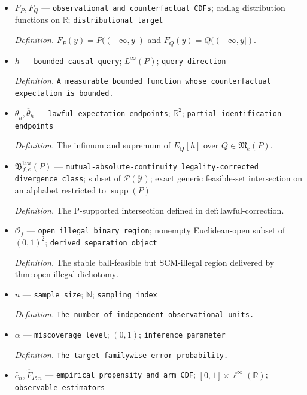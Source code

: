 \documentclass{article}
\begin{document}
\begin{itemize}
  \par\smallskip\noindent\emph{Definition.} The atom-aware piecewise maps defined in \(\mathrm{def:cdf\text{-}maps}\).
  \item \(F_P,F_Q\) --- \texttt{observational and counterfactual CDFs}; cadlag distribution functions on \(\mathbb R\); \texttt{distributional target}
  \par\smallskip\noindent\emph{Definition.} \(F_P(y)=P(({-}\infty,y])\) and \(F_Q(y)=Q(({-}\infty,y])\).
  \item \(h\) --- \texttt{bounded causal query}; \(L^\infty(P)\); \texttt{query direction}
  \par\smallskip\noindent\emph{Definition.} \texttt{A measurable bounded function whose counterfactual expectation is bounded.}
  \item \(\underline\theta_h,\overline\theta_h\) --- \texttt{lawful expectation endpoints}; \(\mathbb R^2\); \texttt{partial-\allowbreak{}identification endpoints}
  \par\smallskip\noindent\emph{Definition.} The infimum and supremum of \(E_Q[h]\) over \(Q\in\mathfrak M_e(P)\).
  \item \(\mathfrak B^{\mathrm{law}}_{f,e}(P)\) --- \texttt{mutual-\allowbreak{}absolute-\allowbreak{}continuity legality-\allowbreak{}corrected divergence class}; subset of \(\mathcal P(\mathcal Y)\); exact generic feasible-set intersection on an alphabet restricted to \(\operatorname{supp}(P)\)
  \par\smallskip\noindent\emph{Definition.} The P-supported intersection defined in \(\mathrm{def:lawful\text{-}correction}\).
  \item \(\mathcal O_f\) --- \texttt{open illegal binary region}; nonempty Euclidean-open subset of \((0,1)^2\); \texttt{derived separation object}
  \par\smallskip\noindent\emph{Definition.} The stable ball-feasible but SCM-illegal region delivered by \(\mathrm{thm:open\text{-}illegal\text{-}dichotomy}\).
  \item \(n\) --- \texttt{sample size}; \(\mathbb N\); \texttt{sampling index}
  \par\smallskip\noindent\emph{Definition.} \texttt{The number of independent observational units.}
  \item \(\alpha\) --- \texttt{miscoverage level}; \((0,1)\); \texttt{inference parameter}
  \par\smallskip\noindent\emph{Definition.} \texttt{The target familywise error probability.}
  \item \(\widehat e_n,\widehat F_{P,n}\) --- \texttt{empirical propensity and arm CDF}; \([0,1]\times\ell^\infty(\mathbb R)\); \texttt{observable estimators}

\end{itemize}
\end{document}
